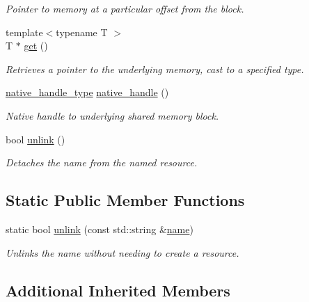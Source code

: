 \begin{DoxyCompactItemize}
\begin{DoxyCompactList}\small\item\em Pointer to memory at a particular offset from the block. \end{DoxyCompactList}\item 
{\footnotesize template$<$typename T $>$ }\\T $\ast$ \hyperlink{classcpen333_1_1process_1_1windows_1_1shared__memory_a3986cdc917b26ab1ab608f59270a47c5}{get} ()
\begin{DoxyCompactList}\small\item\em Retrieves a pointer to the underlying memory, cast to a specified type. \end{DoxyCompactList}\item 
\hyperlink{classcpen333_1_1process_1_1windows_1_1shared__memory_a4a2507680675101666846b0975fa6899}{native\+\_\+handle\+\_\+type} \hyperlink{classcpen333_1_1process_1_1windows_1_1shared__memory_a1827dd03341d7c6afcc02cf078f54e32}{native\+\_\+handle} ()
\begin{DoxyCompactList}\small\item\em Native handle to underlying shared memory block. \end{DoxyCompactList}\item 
bool \hyperlink{classcpen333_1_1process_1_1windows_1_1shared__memory_aa6efdc9a3e1310ea69ecc48aeb41286c}{unlink} ()
\begin{DoxyCompactList}\small\item\em Detaches the name from the named resource. \end{DoxyCompactList}\end{DoxyCompactItemize}
\subsection*{Static Public Member Functions}
\begin{DoxyCompactItemize}
\item 
static bool \hyperlink{classcpen333_1_1process_1_1windows_1_1shared__memory_a99c4766a9995a97595bba1550256f1c9}{unlink} (const std\+::string \&\hyperlink{classcpen333_1_1process_1_1impl_1_1named__resource__base_ae0c5fbb1843afe863cece4b51c38f807}{name})
\begin{DoxyCompactList}\small\item\em Unlinks the name without needing to create a resource. \end{DoxyCompactList}\end{DoxyCompactItemize}
\subsection*{Additional Inherited Members}


